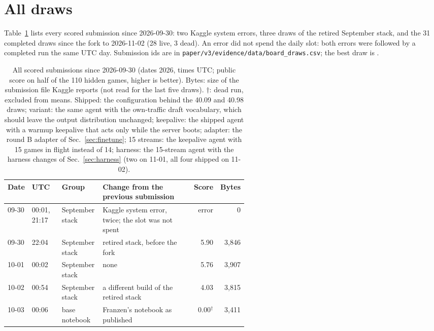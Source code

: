 \section{All draws}\label{app:draws}

Table~\ref{tab:draws} lists every scored submission since 2026-09-30: two Kaggle system errors, three draws of the retired September stack, and the 31 completed draws since the fork to 2026-11-02 (28 live, 3 dead). %
An error did not spend the daily slot: both errors were followed by a completed run the same UTC day. %
Submission ids are in \texttt{paper/v3/evidence/data/board\_draws.csv}; the best draw is . %

\begin{table}[!p]
\caption{All scored submissions since 2026-09-30 (dates 2026, times UTC; public score on half of the 110 hidden games, higher is better). Bytes: size of the submission file Kaggle reports (not read for the last five draws). $\dagger$: dead run, excluded from means. Shipped: the configuration behind the 40.09 and 40.98 draws; variant: the same agent with the own-traffic draft vocabulary, which should leave the output distribution unchanged; keepalive: the shipped agent with a warmup keepalive that acts only while the server boots; adapter: the round B adapter of Sec.~\ref{sec:finetune}; 15 streams: the keepalive agent with 15 games in flight instead of 14; harness: the 15-stream agent with the harness changes of Sec.~\ref{sec:harness} (two on 11-01, all four shipped on 11-02).}\label{tab:draws} %
\centering\footnotesize
\setlength{\tabcolsep}{3.5pt}\renewcommand{\arraystretch}{0.95}
\begin{tabular}{@{}ll>{\raggedright\arraybackslash}p{0.17\linewidth}>{\raggedright\arraybackslash}p{0.38\linewidth}rr@{}}
\toprule
Date & UTC & Group & Change from the previous submission & Score & Bytes \\
\midrule
09-30 & 00:01, 21:17 & September stack & Kaggle system error, twice; the slot was not spent & error & 0 \\ %
09-30 & 22:04 & September stack & retired stack, before the fork & 5.90 & 3,846 \\ %
10-01 & 00:02 & September stack & none & 5.76 & 3,907 \\ %
10-02 & 00:54 & September stack & a different build of the retired stack & 4.03 & 3,815 \\ %
10-03 & 00:06 & base notebook & Franzen's notebook as published & 0.00$^\dagger$ & 3,411 \\ %

\end{tabular}
\end{table}
